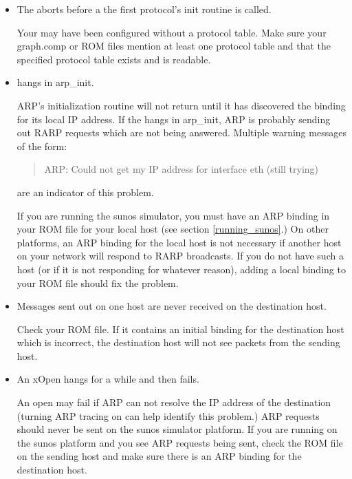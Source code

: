 \begin{itemize}

\item{}
The \xk{} aborts before a the first protocol's init routine is called.

Your \xk{} may have been configured without a protocol table.  Make
sure your graph.comp or ROM files mention at least one protocol table
and that the specified protocol table exists and is readable. 


\item{}
\xk{} hangs in arp\_init. 

ARP's initialization routine will not return until it has discovered
the binding for its local IP address.  If the \xk{} hangs in
arp\_init, ARP is probably sending out RARP requests which are not
being answered.  Multiple warning messages of the form:

\begin{quote}
\begin{tt}
ARP: Could not get my IP address for interface eth (still trying)
\end{tt}
\end{quote}

are an indicator of this problem.

If you are running the sunos simulator, you must have
an ARP binding in your ROM file for your local host (see section
\ref{running_sunos}.)  On other platforms, an ARP binding for the local
host is not necessary if another host on your network will respond to
RARP broadcasts.  If you do not have such a host (or if it is not
responding for whatever reason), adding a local binding to your ROM
file should fix the problem.

\item{}
Messages sent out on one host are never received on the destination host.

Check your ROM file.  If it contains an initial binding for the
destination host which is incorrect, the destination host will not see
packets from the sending host.  

\item{}
An xOpen hangs for a while and then fails.

An open may fail if ARP can not resolve the IP address of the
destination (turning ARP tracing on can help identify this problem.)
ARP requests should never be sent on the sunos simulator platform.  If
you are running on the sunos platform and you see ARP requests being
sent, check the ROM file on the sending host and make sure there is an
ARP binding for the destination host.



\end{itemize}
